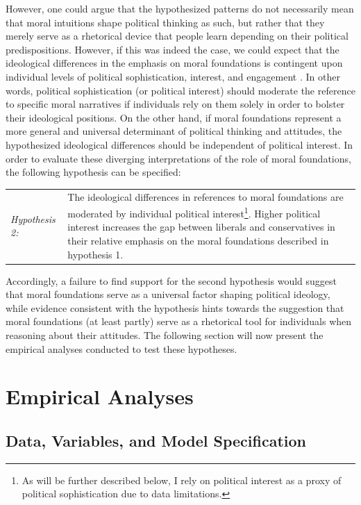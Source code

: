 \documentclass[12pt]{article}
\begin{document}
However, one could argue that the hypothesized patterns do not necessarily mean that moral intuitions shape political thinking as such, but rather that they merely serve as a rhetorical device that people learn depending on their political predispositions. However, if this was indeed the case, we could expect that the ideological differences in the emphasis on moral foundations is contingent upon individual levels of political sophistication, interest, and engagement \citep[see also][]{goren2001core,goren2004political}. In other words, political sophistication (or political interest) should moderate the reference to specific moral narratives if individuals rely on them solely in order to bolster their ideological positions. On the other hand, if moral foundations represent a more general and universal determinant of political thinking and attitudes, the hypothesized ideological differences should be independent of political interest. In order to evaluate these diverging interpretations of the role of moral foundations, the following hypothesis can be specified:

\vspace{0.3cm}
\begin{tabular}{lp{12cm}}
\textsl{Hypothesis 2:} & The ideological differences in references to moral foundations are moderated by individual political interest\footnote{As will be further described below, I rely on political interest as a proxy of political sophistication due to data limitations.}. Higher political interest increases the gap between liberals and conservatives in their relative emphasis on the moral foundations described in hypothesis 1.
\end{tabular}
\vspace{0.5cm}

Accordingly, a failure to find support for the second hypothesis would suggest that moral foundations serve as a universal factor shaping political ideology, while evidence consistent with the hypothesis hints towards the suggestion that moral foundations (at least partly) serve as a rhetorical tool for individuals when reasoning about their attitudes. The following section will now present the empirical analyses conducted to test these hypotheses.


\section{Empirical Analyses}

\subsection{Data, Variables, and Model Specification}
\end{document}
